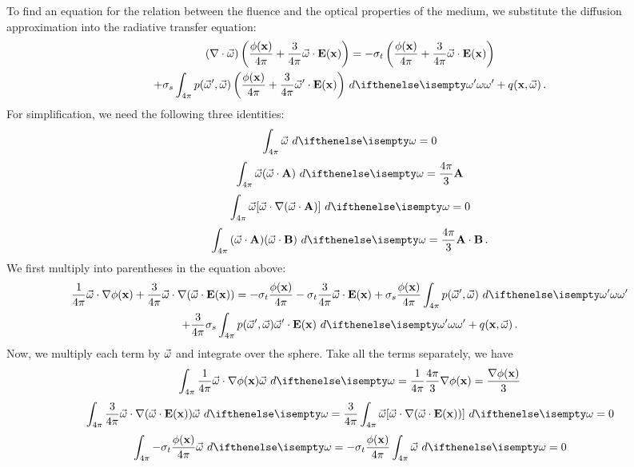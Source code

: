 \documentclass[10pt,a4paper]{article}
\begin{document}
To find an equation for the relation between the fluence and the optical properties of the medium, we substitute the diffusion approximation into the radiative transfer equation:
\begin{multline*}
(\nablavec \cdot \omegavec) \left(\frac{\xfunc{\phi}}{4\pi} + \frac{3}{4\pi} \omegavec \cdot \xvecfunc{E}\right)
= -\extinction\left(\frac{\xfunc{\phi}}{4\pi} + \frac{3}{4\pi} \omegavec \cdot \xvecfunc{E}\right)
 \\+ \scattering \sphere {p(\omegavec', \omegavec) \left(\frac{\xfunc{\phi}}{4\pi} + \frac{3}{4\pi} \omegavec' \cdot\xvecfunc{E}\right)}{\omega'}
 + \xomegafunc{q} \, .
\end{multline*}
For simplification, we need the following three identities:
$$
\sphere{\omegavec}{} = 0
$$
\begin{equation}
\sphere{\omegavec (\omegavec \cdot \mathbf{A}) }{} = \frac{4 \pi}{3} \mathbf{A}
\label{eq:id1}
\end{equation}
$$
\sphere{\omegavec [ \omegavec \cdot \nablavec(\omegavec \cdot \mathbf{A})]}{} = 0 
$$
\begin{equation}
\sphere{ (\omegavec \cdot \mathbf{A}) (\omegavec \cdot \mathbf{B})}{} = \frac{4 \pi}{3} \mathbf{A}\cdot\mathbf{B} \, .
\label{eq:id2}
\end{equation}
We first multiply into parentheses in the equation above:
\begin{multline*}
\frac{1}{4\pi} \omegavec \cdot \nablavec \xfunc{\phi} + \frac{3}{4\pi} \omegavec \cdot \nablavec (\omegavec \cdot \xvecfunc{E})
= -\extinction\frac{\xfunc{\phi}}{4\pi}  -\extinction\frac{3}{4\pi} \omegavec \cdot \xvecfunc{E} + \scattering \frac{\xfunc{\phi}}{4\pi} \sphere {p(\omegavec', \omegavec)}{\omega'}
 \\+ \frac{3}{4\pi} \scattering  \sphere {p(\omegavec', \omegavec)  \omegavec' \cdot \xvecfunc{E}}{\omega'}
 + \xomegafunc{q} \, .
\end{multline*}
Now, we multiply each term by $\vec{\omega}$ and integrate over the sphere. Take all the terms separately, we have
$$
\sphere{\frac{1}{4\pi} \omegavec \cdot \nablavec \xfunc{\phi}\omegavec}{} = \frac{1}{4\pi} \frac{4\pi}{3} \nablavec \xfunc{\phi} = \frac{\nablavec \xfunc{\phi}}{3}
$$
$$
\sphere{\frac{3}{4\pi} \omegavec \cdot \nablavec (\omegavec \cdot \xvecfunc{E}) \omegavec}{} = \frac{3}{4\pi} \sphere{\omegavec [\omegavec \cdot \nablavec (\omegavec \cdot \xvecfunc{E})] }{} = 0
$$
$$
\sphere{-\extinction\frac{\xfunc{\phi}}{4\pi} \omegavec}{} = -\extinction\frac{\xfunc{\phi}}{4\pi} \sphere{\omegavec}{} =  0
$$
\end{document}
